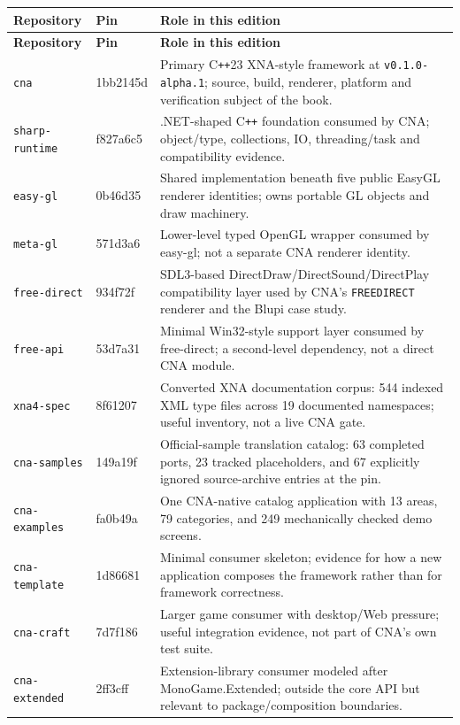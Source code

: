\begin{small}
\begin{longtable}{>{\raggedright\arraybackslash}p{2.25cm}>{\ttfamily}p{1.45cm}>{\raggedright\arraybackslash}p{7.7cm}}
\toprule
\textbf{Repository} & \textbf{Pin} & \textbf{Role in this edition} \\
\midrule
\endfirsthead
\toprule
\textbf{Repository} & \textbf{Pin} & \textbf{Role in this edition} \\
\midrule
\endhead
\texttt{cna} & 1bb2145d & Primary C\texttt{++}23 XNA-style framework at
  \texttt{v0.1.0-alpha.1}; source, build,
  renderer, platform and verification subject of the book. \\
\texttt{sharp-runtime} & f827a6c5 & .NET-shaped C\texttt{++} foundation consumed by CNA;
  object/type, collections, IO, threading/task and compatibility evidence. \\
\texttt{easy-gl} & 0b46d35 & Shared implementation beneath five public EasyGL renderer
  identities; owns portable GL objects and draw machinery. \\
\texttt{meta-gl} & 571d3a6 & Lower-level typed OpenGL wrapper consumed by easy-gl; not a
  separate CNA renderer identity. \\
\texttt{free-direct} & 934f72f & SDL3-based DirectDraw/DirectSound/DirectPlay compatibility
  layer used by CNA's \texttt{FREEDIRECT} renderer and the Blupi case study. \\
\texttt{free-api} & 53d7a31 & Minimal Win32-style support layer consumed by free-direct; a
  second-level dependency, not a direct CNA module. \\
\texttt{xna4-spec} & 8f61207 & Converted XNA documentation corpus: 544 indexed XML type files
  across 19 documented namespaces; useful inventory, not a live CNA gate. \\
\texttt{cna-samples} & 149a19f & Official-sample translation catalog: 63 completed ports, 23
  tracked placeholders, and 67 explicitly ignored source-archive entries at the pin. \\
\texttt{cna-examples} & fa0b49a & One CNA-native catalog application with 13 areas, 79
  categories, and 249 mechanically checked demo screens. \\
\texttt{cna-template} & 1d86681 & Minimal consumer skeleton; evidence for how a new application
  composes the framework rather than for framework correctness. \\
\texttt{cna-craft} & 7d7f186 & Larger game consumer with desktop/Web pressure; useful
  integration evidence, not part of CNA's own test suite. \\
\texttt{cna-extended} & 2ff3cff & Extension-library consumer modeled after
  MonoGame.Extended; outside the core API but relevant to package/composition boundaries. \\
\bottomrule
\end{longtable}
\end{small}

